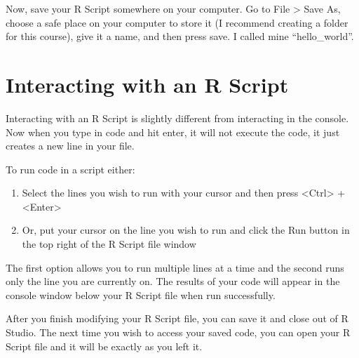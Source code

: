 \documentclass[
]{book}
\providecommand{\tightlist}{%
  \setlength{\itemsep}{0pt}\setlength{\parskip}{0pt}}
\begin{document}
Now, save your R Script somewhere on your computer. Go to File \textgreater{} Save As, choose a safe place on your computer to store it (I recommend creating a folder for this course), give it a name, and then press save. I called mine ``hello\_world''.

\hypertarget{interacting-with-an-r-script}{%
\section{Interacting with an R Script}\label{interacting-with-an-r-script}}

Interacting with an R Script is slightly different from interacting in the console. Now when you type in code and hit enter, it will not execute the code, it just creates a new line in your file.

To run code in a script either:

\begin{enumerate}
\def\labelenumi{\arabic{enumi}.}
\tightlist
\item
  Select the lines you wish to run with your cursor and then press \textless Ctrl\textgreater{} + \textless Enter\textgreater{}
\item
  Or, put your cursor on the line you wish to run and click the Run button in the top right of the R Script file window
\end{enumerate}

The first option allows you to run multiple lines at a time and the second runs only the line you are currently on. The results of your code will appear in the console window below your R Script file when run successfully.

After you finish modifying your R Script file, you can save it and close out of R Studio. The next time you wish to access your saved code, you can open your R Script file and it will be exactly as you left it.

  
\end{document}
